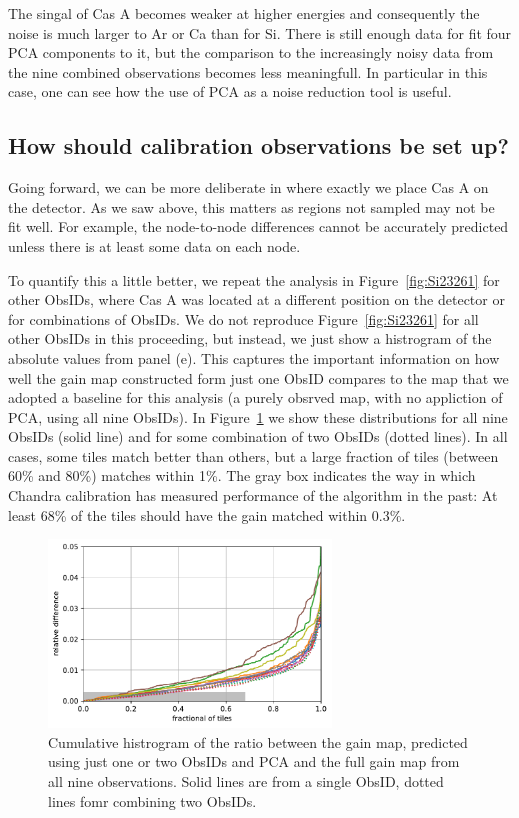 \documentclass[]{spie}  %
\begin{document}
The singal of Cas A becomes weaker at higher energies and consequently the noise is much larger to Ar or Ca than for Si. There is still enough data for fit four PCA components to it, but the comparison to the increasingly noisy data from the nine combined observations becomes less meaningfull. In particular in this case, one can see how the use of PCA as a noise reduction tool is useful.

\subsection{How should calibration observations be set up?}
Going forward, we can be more deliberate in where exactly we place Cas A on the detector. As we saw above, this matters as regions not sampled may not be fit well. For example, the node-to-node differences cannot be accurately predicted unless there is at least some data on each node.

To quantify this a little better, we repeat the analysis in Figure~\ref{fig:Si23261} for other ObsIDs, where Cas A was located at a different position on the detector or for combinations of ObsIDs. We do not reproduce Figure~\ref{fig:Si23261} for all other ObsIDs in this proceeding, but instead, we just show a histrogram of the absolute values from panel (e). This captures the important information on how well the gain map constructed form just one ObsID compares to the map that we adopted a baseline for this analysis (a purely obsrved map, with no appliction of PCA, using all nine ObsIDs). In Figure~\ref{fig:final} we show these distributions for all nine ObsIDs (solid line) and for some combination of two ObsIDs (dotted lines). In all cases, some tiles match better than others, but a large fraction of tiles (between 60\% and 80\%) matches within 1\%. The gray box indicates the way in which Chandra calibration has measured performance of the algorithm in the past: At least 68\% of the tiles should have the gain matched within 0.3\%.

\begin{figure} [ht]
  \begin{center}
    \includegraphics[height=5cm]{figures/final.pdf}
  \end{center}
  \caption
      {Cumulative histrogram of the ratio between the gain map, predicted using just one or two ObsIDs and PCA and the full gain map from all nine observations. Solid lines are from a single ObsID, dotted lines fomr combining two ObsIDs.
        \label{fig:final}}
\end{figure}
\end{document}

